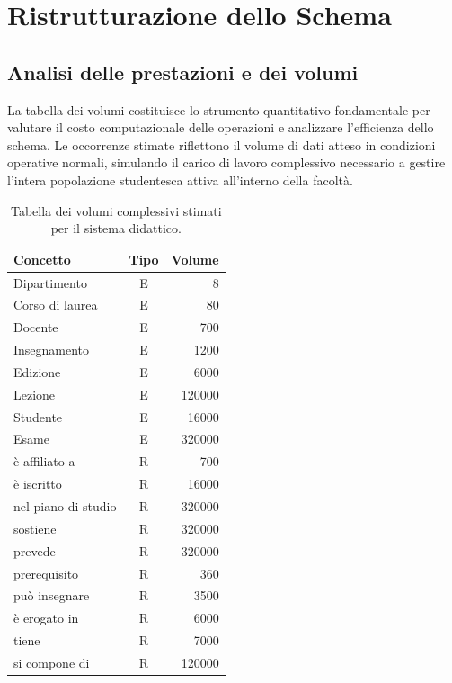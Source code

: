 \section{Ristrutturazione dello Schema}
\label{sec:ristrutturazione-dello-schema}

\subsection{Analisi delle prestazioni e dei volumi}
\label{ssec:analisi-delle-prestazioni-e-dei-volumi}

La tabella dei volumi costituisce lo strumento quantitativo fondamentale per valutare il costo computazionale delle operazioni e analizzare l'efficienza dello schema. Le occorrenze stimate riflettono il volume di dati atteso in condizioni operative normali, simulando il carico di lavoro complessivo necessario a gestire l'intera popolazione studentesca attiva all'interno della facoltà.

\begin{table}[h!]
    \centering
    \renewcommand{\arraystretch}{1.3}
    \begin{tabular}{lcr}
        \hline
        \textbf{Concetto} & \textbf{Tipo} & \textbf{Volume} \\
        \hline
        Dipartimento & E & \num{8} \\
        Corso di laurea & E & \num{80} \\
        Docente & E & \num{700} \\
        Insegnamento & E & \num{1200} \\
        Edizione & E & \num{6000} \\
        Lezione & E & \num{120000} \\
        Studente & E & \num{16000} \\
        Esame & E & \num{320000} \\
        \hline
        è affiliato a & R & \num{700} \\
        è iscritto & R & \num{16000} \\
        nel piano di studio & R & \num{320000} \\
        sostiene & R & \num{320000} \\
        prevede & R & \num{320000} \\
        prerequisito & R & \num{360} \\
        può insegnare & R & \num{3500} \\
        è erogato in & R & \num{6000} \\
        tiene & R & \num{7000} \\
        si compone di & R & \num{120000} \\
        \hline
    \end{tabular}
    \caption{Tabella dei volumi complessivi stimati per il sistema didattico.}
    \label{tab:volumi}
\end{table}


